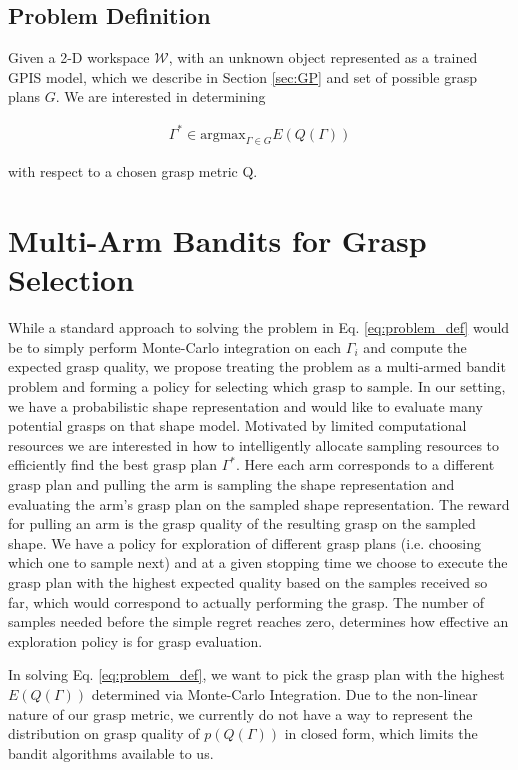 \documentclass[letterpaper, 10 pt, conference]{ieeeconf}  %
\begin{document}
\subsection{Problem Definition}

Given a 2-D workspace $\mathcal{W}$, with an unknown object represented as a trained GPIS model, which we describe in Section \ref{sec:GP} and set of possible grasp plans $G$.
We are interested in determining 

\begin{align}\label{eq:problem_def}
\Gamma^* \in \mbox{argmax}_{\Gamma \in G} E(Q(\Gamma))
\end{align}

with respect to a chosen grasp metric Q. 


\section{Multi-Arm Bandits for Grasp Selection}
While a standard approach to solving the problem in Eq. \ref{eq:problem_def} would be to simply perform Monte-Carlo integration on each $\Gamma_i$ and compute the expected grasp quality, we propose treating the problem as a multi-armed bandit problem and forming a policy for selecting which grasp to sample. 
In our setting, we have a probabilistic shape representation and would like to evaluate many potential grasps on that shape model.
Motivated by limited computational resources we are interested in how to intelligently allocate sampling resources to efficiently find the best grasp plan $\Gamma^*$.
Here each arm corresponds to a different grasp plan and pulling the arm is sampling the shape representation and evaluating the arm's grasp plan on the sampled shape representation.
The reward for pulling an arm is the grasp quality of the resulting grasp on the sampled shape.
We have a policy for exploration of different grasp plans (i.e. choosing which one to sample next) and at a given stopping time we choose to execute the grasp plan with the highest expected quality based on the samples received so far, which would correspond to actually performing the grasp.  
The number of samples needed before the simple regret reaches zero, determines how effective an exploration policy is for grasp evaluation.

In solving Eq. \ref{eq:problem_def}, we want to pick the grasp plan with the highest $E(Q(\Gamma))$ determined via Monte-Carlo Integration.
Due to the non-linear nature of our grasp metric, we currently do not have a way to represent the distribution on grasp quality of $p(Q(\Gamma))$ in closed form, which limits the bandit algorithms available to us. 
\end{document}
